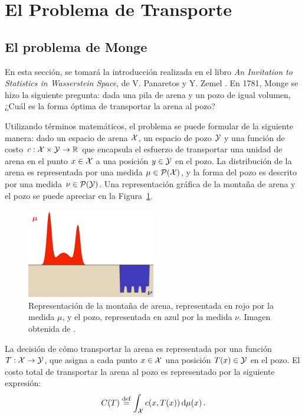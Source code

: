 \section{El Problema de Transporte}
 {



  \subsection*{El problema de Monge}
  {
	  En esta sección, se tomará la introducción realizada en el libro \emph{An Invitation to Statistics in Wasserstein Space}, de V. Panaretos y Y. Zemel \cite{panaretos2020invitation}. En 1781, Monge \cite{monge1781memoire} se hizo la siguiente pregunta: dada una pila de arena y un pozo de igual volumen, ¿Cuál es la forma óptima de transportar la arena al pozo?

	  Utilizando términos matemáticos, el problema se puede formular de la siguiente manera: dado un espacio de arena $\cX$, un espacio de pozo $\cY$ y una función de costo $c: \cX \times \cY \to \R$ que encapsula el esfuerzo de transportar una unidad de arena en el punto $x \in \cX$ a una posición $y \in \cY $ en el pozo. La distribución de la arena es representada por una medida $\mu \in \ProbSpace[\cX]$, y la forma del pozo es descrito por una medida $\nu \in \ProbSpace[\cY] $. Una representación gráfica de la montaña de arena y el pozo se puede apreciar en la Figura~\ref{fig:montanas-arena-pozo}.

	  \begin{figure}[ht]
		  \centering
		  \includegraphics[width=0.5\textwidth]{img/transporte/montanas-arena-pozo.png}
		  \caption{Representación de la montaña de arena, representada en rojo por la medida $\mu$, y el pozo, representada en azul por la medida $\nu$. Imagen obtenida de \cite{cuturi2017primer}.}
		  \label{fig:montanas-arena-pozo}
	  \end{figure}

	  La decisión de cómo transportar la arena es representada por una función $T: \cX \to \cY$, que asigna a cada punto $x \in \cX$ una posición $T(x) \in \cY$ en el pozo. El costo total de transportar la arena al pozo es representado por la siguiente expresión:
	  \begin{equation}\label{eq:costoTotalTransporteMonge}
		  C(T) \eqdef \int_{\cX} c(x, T(x)) \dmu[x].
	  \end{equation}

}}
